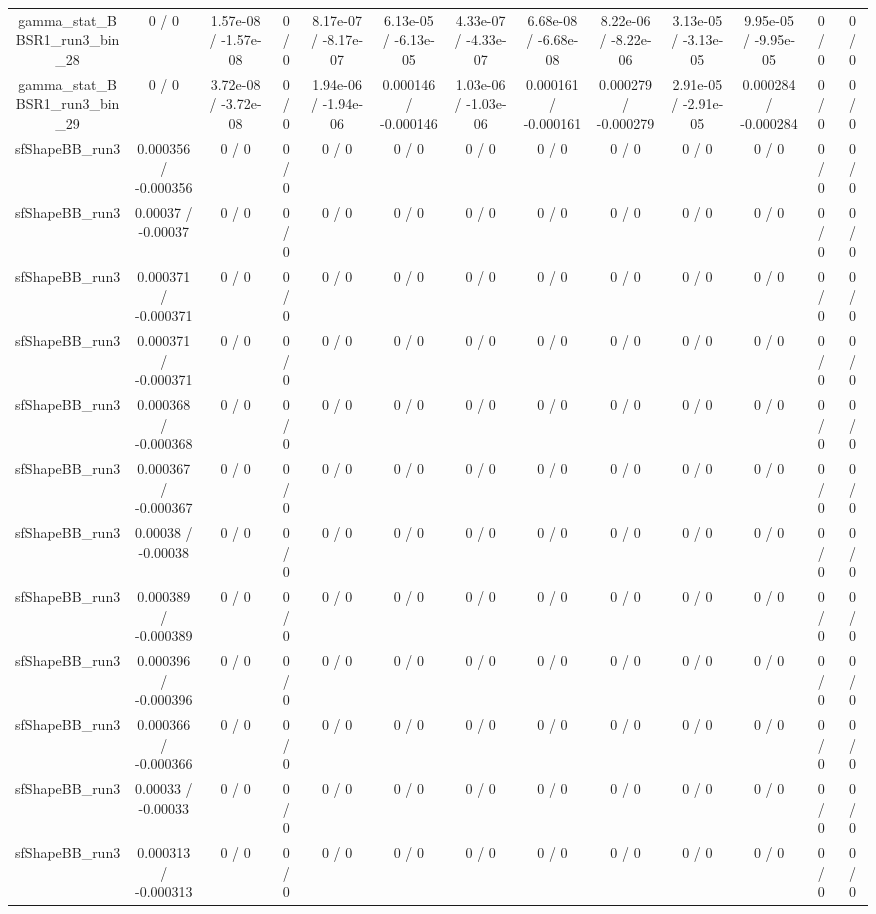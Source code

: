 \documentclass[10pt]{article}
\begin{document}
\begin{table}[htbp]
\begin{center}
\begin{tabular}{|c|c|c|c|c|c|c|c|c|c|c|c|c|}
  gamma_stat_BBSR1_run3_bin_28 & 0 / 0 & 1.57e-08 / -1.57e-08 & 0 / 0 & 8.17e-07 / -8.17e-07 & 6.13e-05 / -6.13e-05 & 4.33e-07 / -4.33e-07 & 6.68e-08 / -6.68e-08 & 8.22e-06 / -8.22e-06 & 3.13e-05 / -3.13e-05 & 9.95e-05 / -9.95e-05 & 0 / 0 & 0 / 0 \\ 
  gamma_stat_BBSR1_run3_bin_29 & 0 / 0 & 3.72e-08 / -3.72e-08 & 0 / 0 & 1.94e-06 / -1.94e-06 & 0.000146 / -0.000146 & 1.03e-06 / -1.03e-06 & 0.000161 / -0.000161 & 0.000279 / -0.000279 & 2.91e-05 / -2.91e-05 & 0.000284 / -0.000284 & 0 / 0 & 0 / 0 \\ 
  sfShapeBB_run3 & 0.000356 / -0.000356 & 0 / 0 & 0 / 0 & 0 / 0 & 0 / 0 & 0 / 0 & 0 / 0 & 0 / 0 & 0 / 0 & 0 / 0 & 0 / 0 & 0 / 0 \\ 
  sfShapeBB_run3 & 0.00037 / -0.00037 & 0 / 0 & 0 / 0 & 0 / 0 & 0 / 0 & 0 / 0 & 0 / 0 & 0 / 0 & 0 / 0 & 0 / 0 & 0 / 0 & 0 / 0 \\ 
  sfShapeBB_run3 & 0.000371 / -0.000371 & 0 / 0 & 0 / 0 & 0 / 0 & 0 / 0 & 0 / 0 & 0 / 0 & 0 / 0 & 0 / 0 & 0 / 0 & 0 / 0 & 0 / 0 \\ 
  sfShapeBB_run3 & 0.000371 / -0.000371 & 0 / 0 & 0 / 0 & 0 / 0 & 0 / 0 & 0 / 0 & 0 / 0 & 0 / 0 & 0 / 0 & 0 / 0 & 0 / 0 & 0 / 0 \\ 
  sfShapeBB_run3 & 0.000368 / -0.000368 & 0 / 0 & 0 / 0 & 0 / 0 & 0 / 0 & 0 / 0 & 0 / 0 & 0 / 0 & 0 / 0 & 0 / 0 & 0 / 0 & 0 / 0 \\ 
  sfShapeBB_run3 & 0.000367 / -0.000367 & 0 / 0 & 0 / 0 & 0 / 0 & 0 / 0 & 0 / 0 & 0 / 0 & 0 / 0 & 0 / 0 & 0 / 0 & 0 / 0 & 0 / 0 \\ 
  sfShapeBB_run3 & 0.00038 / -0.00038 & 0 / 0 & 0 / 0 & 0 / 0 & 0 / 0 & 0 / 0 & 0 / 0 & 0 / 0 & 0 / 0 & 0 / 0 & 0 / 0 & 0 / 0 \\ 
  sfShapeBB_run3 & 0.000389 / -0.000389 & 0 / 0 & 0 / 0 & 0 / 0 & 0 / 0 & 0 / 0 & 0 / 0 & 0 / 0 & 0 / 0 & 0 / 0 & 0 / 0 & 0 / 0 \\ 
  sfShapeBB_run3 & 0.000396 / -0.000396 & 0 / 0 & 0 / 0 & 0 / 0 & 0 / 0 & 0 / 0 & 0 / 0 & 0 / 0 & 0 / 0 & 0 / 0 & 0 / 0 & 0 / 0 \\ 
  sfShapeBB_run3 & 0.000366 / -0.000366 & 0 / 0 & 0 / 0 & 0 / 0 & 0 / 0 & 0 / 0 & 0 / 0 & 0 / 0 & 0 / 0 & 0 / 0 & 0 / 0 & 0 / 0 \\ 
  sfShapeBB_run3 & 0.00033 / -0.00033 & 0 / 0 & 0 / 0 & 0 / 0 & 0 / 0 & 0 / 0 & 0 / 0 & 0 / 0 & 0 / 0 & 0 / 0 & 0 / 0 & 0 / 0 \\ 
  sfShapeBB_run3 & 0.000313 / -0.000313 & 0 / 0 & 0 / 0 & 0 / 0 & 0 / 0 & 0 / 0 & 0 / 0 & 0 / 0 & 0 / 0 & 0 / 0 & 0 / 0 & 0 / 0 \\ 

\end{tabular}
\end{center}
\end{table}
\end{document}

